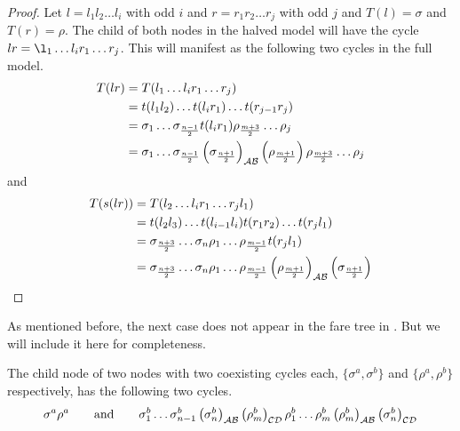 \begin{proof}
    Let $l = l_1l_2 \dots l_i$ with odd $i$ and $r = r_1r_2 \dots r_j$ with odd $j$ and $T(l) = \sigma$ and $T(r) = \rho$.
    The child of both nodes in the halved model will have the cycle $lr = \l_1 \dots l_i r_1 \dots r_j$.
    This will manifest as the following two cycles in the full model.
    \begin{align*}
        T(lr) & = T(l_1 \dots l_i r_1 \dots r_j)                                                    \\
              & = t(l_1l_2) \dots t(l_ir_1) \dots t(r_{j-1}r_j)                                     \\
              & = \sigma_1 \dots \sigma_{\frac{n-1}{2}} t(l_ir_1) \rho_{\frac{m+3}{2}} \dots \rho_j \\
              & = \sigma_1 \dots \sigma_{\frac{n-1}{2}} \left(\sigma_{\frac{n+1}{2}}\right)_{\mathcal{A}\mathcal{B}}
        \left(\rho_{\frac{m+1}{2}}\right) \rho_{\frac{m+3}{2}} \dots \rho_j
    \end{align*}
    and
    \begin{align*}
        T(s(lr)) & = T(l_2 \dots l_i r_1 \dots r_j l_1)                                                \\
                 & = t(l_2l_3) \dots t(l_{i-1}l_i) t(r_1r_2) \dots t(r_jl_1)                           \\
                 & = \sigma_{\frac{n+3}{2}} \dots \sigma_n \rho_1 \dots \rho_{\frac{m-1}{2}} t(r_jl_1) \\
                 & = \sigma_{\frac{n+3}{2}} \dots \sigma_n \rho_1 \dots \rho_{\frac{m-1}{2}}
        \left(\rho_{\frac{m+1}{2}}\right)_{\mathcal{A}\mathcal{B}} \left(\sigma_{\frac{n+1}{2}}\right)
    \end{align*}
\end{proof}


As mentioned before, the next case does not appear in the fare tree in .
But we will include it here for completeness.

\begin{theorem}
    The child node of two nodes with two coexisting cycles each, $\{\sigma^a, \sigma^b\}$ and $\{\rho^a, \rho^b\}$ respectively, has the following two cycles.
    \begin{align*}
        \sigma^a\rho^a \qquad \text{and} \qquad
        \sigma^b_1 \dots \sigma^b_{n-1} \left(\sigma^b_n\right)_{\mathcal{A}\mathcal{B}} \left(\rho^b_m\right)_{\mathcal{C}\mathcal{D}} \rho^b_1 \dots \rho^b_m \left(\rho^b_m\right)_{\mathcal{A}\mathcal{B}} \left(\sigma^b_n\right)_{\mathcal{C}\mathcal{D}}
    \end{align*}
\end{theorem}

